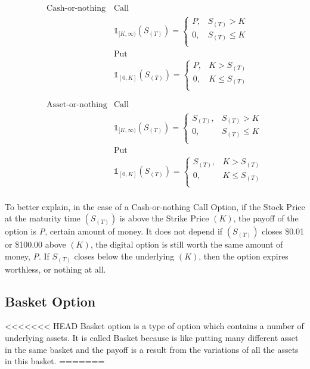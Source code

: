 \documentclass[]{elsarticle}
\theoremstyle{definition}
\theoremstyle{remark}
\begin{document}
$$ \begin{array}{rcc}
\text{Cash-or-nothing} & \text{Call}\\
 & \mathbb{1}_{[K,\infty)}(S_{(T)})=
\begin{cases}
P, & S_{(T)} > K \\
0, & S_{(T)} \leq K\\
\end{cases}\\
 & \text{Put}\\
 & \mathbb{1}_{[0,K]}(S_{(T)})=
\begin{cases}
P, & K > S_{(T)} \\
0, & K \leq S_{(T)}\\
\end{cases} \\
\\
\\
\text{Asset-or-nothing} & \text{Call}\\
& \mathbb{1}_{[K,\infty)}(S_{(T)})=
\begin{cases}
S_{(T)}, & S_{(T)} > K \\
0, & S_{(T)} \leq K\\
\end{cases}\\
& \text{Put}\\
& \mathbb{1}_{[0,K]}(S_{(T)})=
\begin{cases}
S_{(T)}, & K > S_{(T)} \\
0, & K \leq S_{(T)}\\
\end{cases} \\
\end{array} $$

To better explain, in the case of a Cash-or-nothing Call Option, if the Stock Price at the maturity time $(S_{(T)})$ is above the Strike Price $(K)$, the payoff of the option is \textit{P}, certain amount of money.  It does not depend if $(S_{(T)})$ closes \$0.01 or \$100.00 above $(K)$, the  digital option is still worth the same amount of money, \textit{P}. If $S_{(T)}$  closes below the underlying $(K)$, then the option expires worthless, or nothing at all.


\subsection{Basket Option}
<<<<<<< HEAD
Basket option is a type of option  which contains a number of underlying assets. It is called Basket because is like putting many different asset in the same basket and the payoff is a result from the variations of all the assets in this basket. 
=======
\end{document}

